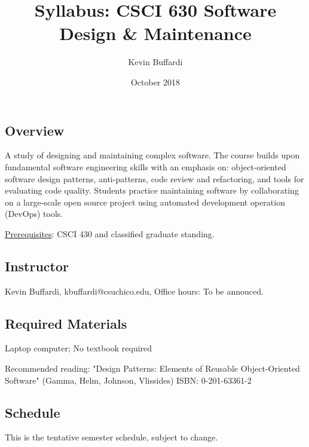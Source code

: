 \documentclass[12pt]{article}
\title{Syllabus: CSCI 630 Software Design \& Maintenance}
\author{Kevin Buffardi}
\date{October 2018}
\begin{document}
  \maketitle
  \subsection*{Overview}	 
  \noindent
  A study of designing and maintaining complex software. The course builds upon fundamental software engineering skills with an emphasis on: object-oriented software design patterns, anti-patterns, code review and refactoring, and tools for evaluating code quality. Students practice maintaining software by collaborating on a large-scale open source project using automated development operation (DevOps) tools.

  \underline{Prerequisites}: CSCI 430 and classified graduate standing.
  
  \subsection*{Instructor}
  \noindent
  Kevin Buffardi, kbuffardi@csuchico.edu, Office hours: To be annouced.

  \subsection*{Required Materials}
  \noindent
  Laptop computer; No textbook required

  Recommended reading: "Design Patterns: Elements of Reusable Object-Oriented Software" (Gamma, Helm, Johnson, Vlissides) ISBN: 0-201-63361-2

  \subsection*{Schedule}
  \noindent
  This is the tentative semester schedule, subject to change.
\end{document}
